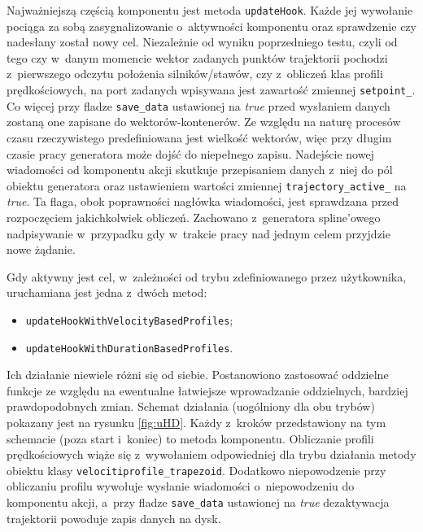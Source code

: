 \documentclass[a4paper, 12pt]{article}
\begin{document}
	\par Najważniejszą częścią komponentu jest metoda \texttt{updateHook}. Każde jej wywołanie pociąga za sobą zasygnalizowanie o~aktywności komponentu oraz sprawdzenie czy nadesłany został nowy cel. Niezależnie od wyniku poprzedniego testu, czyli od tego czy w~danym momencie wektor zadanych punktów trajektorii pochodzi z~pierwszego odczytu położenia silników/stawów, czy z~obliczeń klas profili prędkościowych, na port zadanych wpisywana jest zawartość zmiennej \texttt{setpoint\_}. Co więcej przy fladze \texttt{save\_data} ustawionej na \textit{true} przed wysłaniem danych zostaną one zapisane do wektorów-kontenerów. Ze względu na naturę procesów czasu rzeczywistego predefiniowana jest wielkość wektorów, więc przy długim czasie pracy generatora może dojść do niepełnego zapisu. Nadejście nowej wiadomości od komponentu akcji skutkuje przepisaniem danych z~niej do pól obiektu generatora oraz ustawieniem wartości zmiennej \texttt{trajectory\_active\_} na \textit{true}. Ta flaga, obok poprawności nagłówka wiadomości, jest sprawdzana przed rozpoczęciem jakichkolwiek obliczeń. Zachowano z~generatora spline'owego nadpisywanie w~przypadku gdy w~trakcie pracy nad jednym celem przyjdzie nowe żądanie. 
	\par Gdy aktywny jest cel, w~zależności od trybu zdefiniowanego przez użytkownika, uruchamiana jest jedna z~dwóch metod:
	\begin{itemize}
	\item \texttt{updateHookWithVelocityBasedProfiles};
	\item \texttt{updateHookWithDurationBasedProfiles}.
	\end{itemize}
	Ich działanie niewiele różni się od siebie. Postanowiono zastosować oddzielne funkcje ze względu na ewentualne łatwiejsze wprowadzanie oddzielnych, bardziej prawdopodobnych zmian. Schemat działania (uogólniony dla obu trybów) pokazany jest na rysunku \ref{fig:uHD}. Każdy z~kroków przedstawiony na tym schemacie (poza start i~koniec) to metoda komponentu. Obliczanie profili prędkościowych wiąże się z~wywołaniem odpowiedniej dla trybu działania metody obiektu klasy \texttt{velocitiprofile\_trapezoid}. Dodatkowo niepowodzenie przy obliczaniu profilu wywołuje wysłanie wiadomości o~niepowodzeniu do komponentu akcji, a~przy fladze \texttt{save\_data} ustawionej na \textit{true} dezaktywacja trajektorii powoduje zapis danych na dysk.
\end{document}
